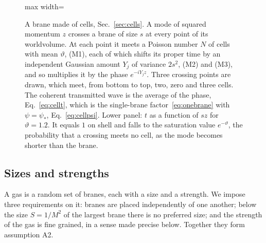 \documentclass[a4paper,11pt]{article}
\begin{document}
\begin{figure}[t]
\begin{adjustbox}{max width=\linewidth}
\end{adjustbox}
\caption{A brane made of cells, Sec.~\ref{sec:cells}. A mode of squared momentum $z$ crosses a brane of size $s$ at every point of its worldvolume. At each point it meets a Poisson number $N$ of cells with mean $\vartheta$, (M1), each of which shifts its proper time by an independent Gaussian amount $Y_j$ of variance $2s^2$, (M2) and (M3), and so multiplies it by the phase $e^{-iY_jz}$. Three crossing points are drawn, which meet, from bottom to top, two, zero and three cells. The coherent transmitted wave is the average of the phase, Eq.~\eqref{eq:cellt}, which is the single-brane factor~\eqref{eq:onebrane} with $\psi=\psi_*$, Eq.~\eqref{eq:cellpsi}. Lower panel: $t$ as a function of $sz$ for $\vartheta=1.2$. It equals $1$ on shell and falls to the saturation value $e^{-\vartheta}$, the probability that a crossing meets no cell, as the mode becomes shorter than the brane.}
\label{fig:cells}
\end{figure}

\subsection{Sizes and strengths}
\label{sec:sizes}

A gas is a random set of branes, each with a size and a strength. We impose three requirements on it: branes are placed independently of one another; below the size $S=1/M^2$ of the largest brane there is no preferred size; and the strength of the gas is fine grained, in a sense made precise below. Together they form assumption A2.
\end{document}
